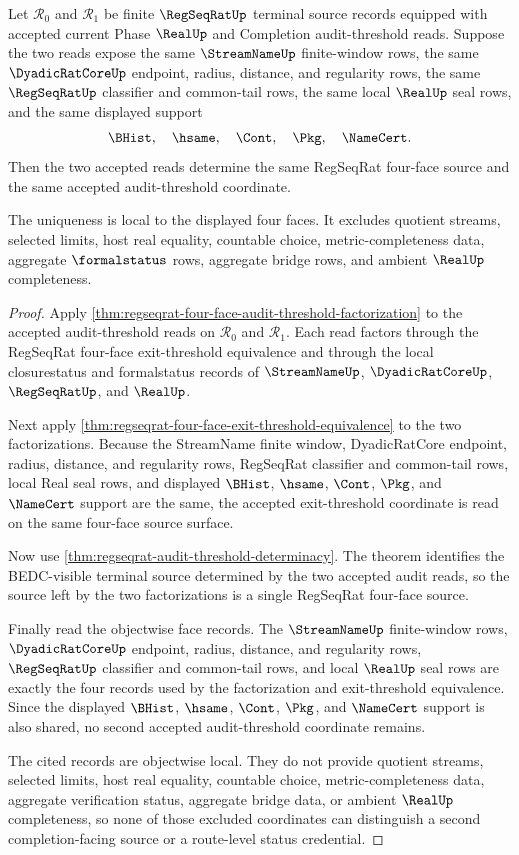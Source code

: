 \begin{theorem}
\label{thm:regseqrat-four-face-audit-source-uniqueness}
Let $\mathcal R_0$ and $\mathcal R_1$ be finite $\RegSeqRatUp$ terminal source records equipped with accepted current Phase $\RealUp$ and Completion audit-threshold reads. Suppose the two reads expose the same $\StreamNameUp$ finite-window rows, the same $\DyadicRatCoreUp$ endpoint, radius, distance, and regularity rows, the same $\RegSeqRatUp$ classifier and common-tail rows, the same local $\RealUp$ seal rows, and the same displayed support
$$
\BHist,\quad \hsame,\quad \Cont,\quad \Pkg,\quad \NameCert.
$$
Then the two accepted reads determine the same RegSeqRat four-face source and the same accepted audit-threshold coordinate.

The uniqueness is local to the displayed four faces. It excludes quotient streams, selected limits, host real equality, countable choice, metric-completeness data, aggregate $\formalstatus$ rows, aggregate bridge rows, and ambient $\RealUp$ completeness.
\end{theorem}
\begin{proof}
Apply \autoref{thm:regseqrat-four-face-audit-threshold-factorization} to the accepted audit-threshold reads on $\mathcal R_0$ and $\mathcal R_1$. Each read factors through the RegSeqRat four-face exit-threshold equivalence and through the local closurestatus and formalstatus records of $\StreamNameUp$, $\DyadicRatCoreUp$, $\RegSeqRatUp$, and $\RealUp$.

Next apply \autoref{thm:regseqrat-four-face-exit-threshold-equivalence} to the two factorizations. Because the StreamName finite window, DyadicRatCore endpoint, radius, distance, and regularity rows, RegSeqRat classifier and common-tail rows, local Real seal rows, and displayed $\BHist$, $\hsame$, $\Cont$, $\Pkg$, and $\NameCert$ support are the same, the accepted exit-threshold coordinate is read on the same four-face source surface.

Now use \autoref{thm:regseqrat-audit-threshold-determinacy}. The theorem identifies the BEDC-visible terminal source determined by the two accepted audit reads, so the source left by the two factorizations is a single RegSeqRat four-face source.

Finally read the objectwise face records. The $\StreamNameUp$ finite-window rows, $\DyadicRatCoreUp$ endpoint, radius, distance, and regularity rows, $\RegSeqRatUp$ classifier and common-tail rows, and local $\RealUp$ seal rows are exactly the four records used by the factorization and exit-threshold equivalence. Since the displayed $\BHist$, $\hsame$, $\Cont$, $\Pkg$, and $\NameCert$ support is also shared, no second accepted audit-threshold coordinate remains.

The cited records are objectwise local. They do not provide quotient streams, selected limits, host real equality, countable choice, metric-completeness data, aggregate verification status, aggregate bridge data, or ambient $\RealUp$ completeness, so none of those excluded coordinates can distinguish a second completion-facing source or a route-level status credential.
\end{proof}

